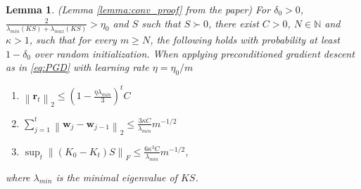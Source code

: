 \documentclass[10pt]{article} %
\theoremstyle{plain}
\newtheorem{lemma}[theorem]{Lemma}
\theoremstyle{definition}
\theoremstyle{remark}
\newcommand{\norm}[1]{\left\lVert#1\right\rVert}
\newcommand{\res}{\mathbf{r}}
\newcommand{\w}{\mathbf{w}}
\begin{document}
\begin{lemma}(Lemma \ref{lemma:conv_proof} from the paper) %
For $\delta_0 > 0$, $\frac{2}{\lambda_{min}(KS)+\lambda_{max}(KS)}>\eta_0 $  and $S$ such that $S\succ 0$, there
exist $C > 0$, $N \in  \mathbb{N}$ and $\kappa > 1$, such that for every $m \geq N$, the following holds with probability at
least $1-\delta_0$ over random initialization. When applying  preconditioned gradient descent as in \eqref{eq:PGD} with learning rate $\eta=\eta_0/m$
\begin{enumerate}
    \item $\norm{\res_t}_2\leq \left(1-\frac{\eta \lambda_{min}}{3}\right)^tC$
    \item $\sum_{j=1}^t\norm{\w_j-\w_{j-1}}_2\leq \frac{3\kappa C}{\lambda_{min}}m^{-1/2}$
    \item $\sup_t \norm{(K_0-K_t)S}_F\leq \frac{6\kappa^3C}{\lambda_{min}}m^{-1/2}$,
\end{enumerate}
where $\lambda_{min}$ is the minimal eigenvalue of $KS$.
\end{lemma}
\end{document}
